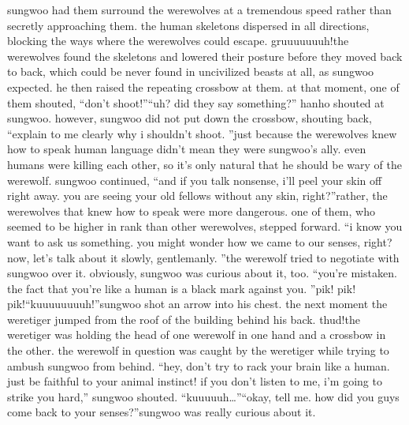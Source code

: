 sungwoo had them surround the werewolves at a tremendous speed rather than secretly approaching them.
 the human skeletons dispersed in all directions, blocking the ways where the werewolves could escape.
gruuuuuuuh!the werewolves found the skeletons and lowered their posture before they moved back to back, which could be never found in uncivilized beasts at all, as sungwoo expected.
he then raised the repeating crossbow at them.
at that moment, one of them shouted, “don’t shoot!”“uh? did they say something?” hanho shouted at sungwoo.
however, sungwoo did not put down the crossbow, shouting back, “explain to me clearly why i shouldn’t shoot.
”just because the werewolves knew how to speak human language didn’t mean they were sungwoo’s ally.
 even humans were killing each other, so it’s only natural that he should be wary of the werewolf.
sungwoo continued, “and if you talk nonsense, i’ll peel your skin off right away.
 you are seeing your old fellows without any skin, right?”rather, the werewolves that knew how to speak were more dangerous.
 one of them, who seemed to be higher in rank than other werewolves, stepped forward.
“i know you want to ask us something.
 you might wonder how we came to our senses, right? now, let’s talk about it slowly, gentlemanly.
”the werewolf tried to negotiate with sungwoo over it.
 obviously, sungwoo was curious about it, too.
“you’re mistaken.
 the fact that you’re like a human is a black mark against you.
”pik! pik! pik!“kuuuuuuuuh!”sungwoo shot an arrow into his chest.
 the next moment the weretiger jumped from the roof of the building behind his back.
thud!the weretiger was holding the head of one werewolf in one hand and a crossbow in the other.
 the werewolf in question was caught by the weretiger while trying to ambush sungwoo from behind.
“hey, don’t try to rack your brain like a human.
 just be faithful to your animal instinct! if you don’t listen to me, i’m going to strike you hard,” sungwoo shouted.
“kuuuuuh…”“okay, tell me.
 how did you guys come back to your senses?”sungwoo was really curious about it.


 